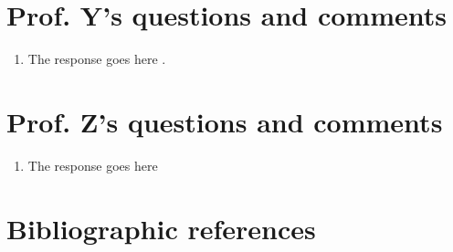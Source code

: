 
\clearpage
\section{Prof. Y's questions and comments}

\begin{enumerate} [label=\textcolor{RoyalBlue}{\arabic*.},leftmargin=2.5\baselineskip, itemsep=\baselineskip,parsep=\baselineskip]

\item {}

The response goes here \cite{einstein}.


\end{enumerate}







\clearpage
\section{Prof. Z's questions and comments}

\begin{enumerate} [label=\textcolor{RoyalBlue}{\arabic*.},leftmargin=2.5\baselineskip, itemsep=\baselineskip,parsep=\baselineskip]

\item {}

The response goes here 



\end{enumerate}





\clearpage
\section*{Bibliographic references}
\printbibliography[heading=none]


